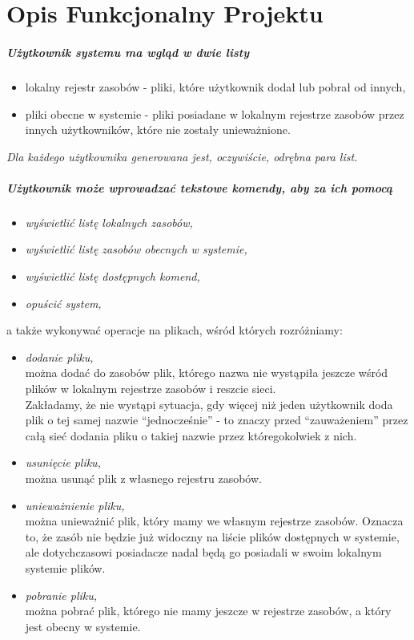 \documentclass[11pt]{book}
\newcommand{\+}{\discretionary{\mbox{\scriptsize$\hookleftarrow$}}{}{}}
\begin{document}
\chapter{Opis Funkcjonalny Projektu}
\paragraph{Użytkownik systemu ma wgląd w dwie listy}
\begin{itemize}
\item
lokalny rejestr zasobów - pliki, które użytkownik dodał lub pobrał od innych,
\item
pliki obecne w systemie - pliki posiadane w lokalnym rejestrze zasobów przez innych użytkowników, które nie zostały unieważnione.
\end{itemize}
\textsl{Dla każdego użytkownika generowana jest, oczywiście, odrębna para list.}

\paragraph{Użytkownik może wprowadzać tekstowe komendy, aby za ich pomocą}
\begin{itemize}
\item
\textsl{wyświetlić listę lokalnych zasobów,}
\item 
\textsl{wyświetlić listę zasobów obecnych w systemie,}
\item
\textsl{wyświetlić listę dostępnych komend,}
\item
\textsl{opuścić system,}
\end{itemize}
a także wykonywać operacje na plikach, wśród których rozróżniamy:
\begin{itemize}
\item
\textsl{dodanie pliku,}\\
można dodać do zasobów plik, którego nazwa nie wystąpiła jeszcze wśród plików w lokalnym rejestrze zasobów i reszcie sieci.\\
Zakładamy, że nie wystąpi sytuacja, gdy więcej niż jeden użytkownik doda plik o tej samej nazwie “jednocześnie” - to znaczy przed “zauważeniem” przez całą sieć dodania pliku o takiej nazwie przez któregokolwiek z nich.
\item
\textsl{usunięcie pliku,}\\
można usunąć plik z własnego rejestru zasobów.
\item
\textsl{unieważnienie pliku,}\\
można unieważnić plik, który mamy we własnym rejestrze zasobów. Oznacza to, że zasób nie będzie już widoczny na liście plików dostępnych w systemie, ale dotychczasowi posiadacze nadal będą go posiadali w swoim lokalnym systemie plików.
\item
\textsl{pobranie pliku,}\\
można pobrać plik, którego nie mamy jeszcze w rejestrze zasobów, a który jest obecny w systemie.
\end{itemize}
\end{document}
